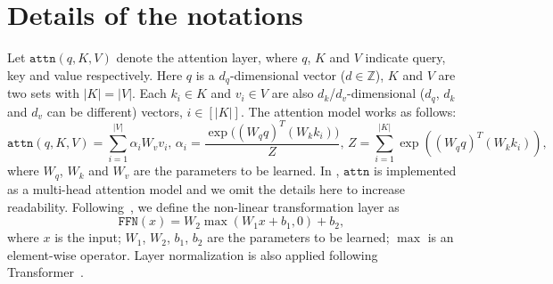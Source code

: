 \documentclass{article} \usepackage{iclr2020_conference,times}
\newcommand{\attn}{\texttt{attn}}
\newcommand{\ffn}{\texttt{FFN}}
\begin{document}
\section{Details of the notations}\label{app:notation_details}
Let $\attn(q,K,V)$ denote the attention layer, where $q$, $K$ and $V$ indicate query, key and value respectively. Here $q$ is a $d_q$-dimensional vector ($d\in\mathbb{Z}$), $K$ and $V$ are two sets with $\vert K\vert=\vert V\vert$. Each $k_i\in K$ and $v_i\in V$ are also $d_k$/$d_v$-dimensional ($d_q$, $d_k$ and $d_v$ can be different) vectors, $i\in[\vert K\vert]$. The attention model works as follows:
\begin{equation}
\attn(q,K,V)=\sum_{i=1}^{\vert V\vert}\alpha_i
W_vv_i,\,\alpha_i=\frac{\exp\big((W_qq)^T(W_kk_i)\big)}{Z},\,Z=\sum_{i=1}^{\vert K\vert}\exp((W_qq)^T(W_kk_i)),
\label{eqn:attention_model}
\end{equation}
where $W_q$, $W_k$ and $W_v$ are the parameters to be learned. In \citet{vaswani2017attention}, $\attn$ is implemented as a multi-head attention model and we omit the details here to increase readability. Following~\citet{vaswani2017attention}, we define the non-linear transformation layer as 
\begin{equation}
\ffn(x)=W_2\max(W_1x+b_1,0)+b_2,
\label{eq:ffn}
\end{equation}
where $x$ is the input; $W_1$, $W_2$, $b_1$, $b_2$ are the parameters to be learned; $\max$ is an element-wise operator. Layer normalization is also applied following Transformer~\citep{vaswani2017attention}.
\end{document}
